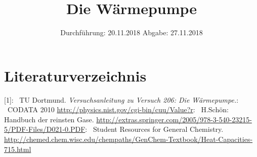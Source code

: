 

\subject{Nr.206}
\title{Die Wärmepumpe}
\date{%
  Durchführung: 20.11.2018
  \hspace{3em}
  Abgabe: 27.11.2018
}



\maketitle
\thispagestyle{empty}
\tableofcontents
\newpage







\section{Literaturverzeichnis}

[1]: \ TU Dortmund. \textit{Versuchsanleitung zu Versuch 206: Die Wärmepumpe.}\newline
[2]: \ CODATA 2010 \url{http://physics.nist.gov/cgi-bin/cuu/Value?r}\newline
[3]: \ H.Schön: Handbuch der reinsten Gase. \url{http://extras.springer.com/2005/978-3-540-23215-5/PDF-Files/D021-0.PDF}\newline
[4]: \ Student Resources for General Chemistry. \url{http://chemed.chem.wisc.edu/chempaths/GenChem-Textbook/Heat-Capacities-715.html}

\printbibliography{}


